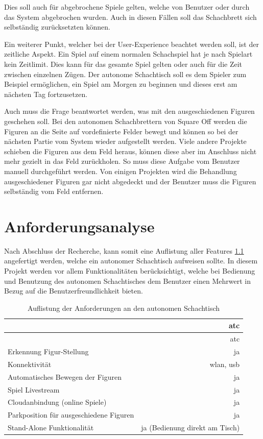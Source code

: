 Dies soll auch für abgebrochene Spiele gelten, welche von Benutzer oder
durch das System abgebrochen wurden. Auch in diesen Fällen soll das
Schachbrett sich selbständig zurücksetzten können.

Ein weiterer Punkt, welcher bei der User-Experience beachtet werden
soll, ist der zeitliche Aspekt. Ein Spiel auf einem normalen Schachspiel
hat je nach Spielart kein Zeitlimit. Dies kann für das gesamte Spiel
gelten oder auch für die Zeit zwischen einzelnen Zügen. Der autonome
Schachtisch soll es dem Spieler zum Beispiel ermöglichen, ein Spiel am
Morgen zu beginnen und dieses erst am nächsten Tag fortzusetzen.

Auch muss die Frage beantwortet werden, was mit den ausgeschiedenen
Figuren geschehen soll. Bei den autonomen Schachbrettern von Square
Off\cite{squareoffgrand} werden die Figuren an die Seite auf
vordefinierte Felder bewegt und können so bei der nächsten Partie vom
System wieder aufgestellt werden. Viele andere Projekte schieben die
Figuren aus dem Feld heraus, können diese aber im Anschluss nicht mehr
gezielt in das Feld zurückholen. So muss diese Aufgabe vom Benutzer
manuell durchgeführt werden. Von einigen Projekten wird die Behandlung
ausgeschiedener Figuren gar nicht abgedeckt und der Benutzer muss die
Figuren selbständig vom Feld entfernen.

\hypertarget{anforderungsanalyse}{%
\chapter{Anforderungsanalyse}\label{anforderungsanalyse}}

Nach Abschluss der Recherche, kann somit eine Auflistung aller Features
\ref{atcrequirements} angefertigt werden, welche ein autonomer
Schachtisch aufweisen sollte. In diesem Projekt werden vor allem
Funktionalitäten berücksichtigt, welche bei Bedienung und Benutzung des
autonomen Schachtisches dem Benutzer einen Mehrwert in Bezug auf die
Benutzerfreundlichkeit bieten.

\begin{longtable}[]{@{}lr@{}}
\caption{Auflistung der Anforderungen an den autonomen Schachtisch
\label{atcrequirements}}\tabularnewline
\toprule
& \gls{atc}\tabularnewline
\midrule
\endfirsthead
\toprule
& \gls{atc}\tabularnewline
\midrule
\endhead
Erkennung Figur-Stellung & ja\tabularnewline
Konnektivität & \gls{wlan}, \gls{usb}\tabularnewline
Automatisches Bewegen der Figuren & ja\tabularnewline
Spiel Livestream & ja\tabularnewline
Cloudanbindung (online Spiele) & ja\tabularnewline
Parkposition für ausgeschiedene Figuren & ja\tabularnewline
Stand-Alone Funktionalität & ja (Bedienung direkt am
Tisch)\tabularnewline
\bottomrule
\end{longtable}


